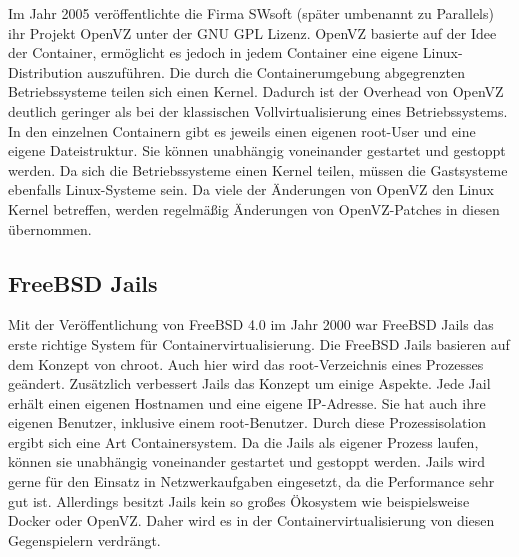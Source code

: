 Im Jahr 2005 veröffentlichte die Firma SWsoft (später umbenannt zu Parallels) ihr Projekt OpenVZ unter der GNU GPL Lizenz. OpenVZ basierte auf der Idee der Container, ermöglicht es jedoch in jedem Container eine eigene Linux-Distribution auszuführen.
Die durch die Containerumgebung abgegrenzten Betriebssysteme teilen sich einen Kernel. Dadurch ist der Overhead von OpenVZ deutlich geringer als bei der klassischen Vollvirtualisierung eines Betriebssystems.
In den einzelnen Containern gibt es jeweils einen eigenen root-User und eine eigene Dateistruktur.
Sie können unabhängig voneinander gestartet und gestoppt werden.
Da sich die Betriebssysteme einen Kernel teilen, müssen die Gastsysteme ebenfalls Linux-Systeme sein.
Da viele der Änderungen von OpenVZ den Linux Kernel betreffen, werden regelmäßig Änderungen von OpenVZ-Patches in diesen übernommen. \citep{OpenVzNews, IEEE4803091,OpenVzHist}


\subsection*{FreeBSD Jails}
\label{sec:jails}
Mit der Veröffentlichung von FreeBSD 4.0 im Jahr 2000 war FreeBSD Jails das erste richtige System für Containervirtualisierung.
Die FreeBSD Jails basieren auf dem Konzept von chroot. Auch hier wird das root-Verzeichnis eines Prozesses geändert. Zusätzlich verbessert Jails das Konzept um einige Aspekte. Jede Jail erhält einen eigenen Hostnamen und eine eigene IP-Adresse. Sie hat auch ihre eigenen Benutzer, inklusive einem root-Benutzer. \citep{FreeBSDHB14} Durch diese Prozessisolation ergibt sich eine Art Containersystem. Da die Jails als eigener Prozess laufen, können sie unabhängig voneinander gestartet und gestoppt werden. Jails wird gerne für den Einsatz in Netzwerkaufgaben eingesetzt, da die Performance sehr gut ist. Allerdings besitzt Jails kein so großes Ökosystem wie beispielsweise Docker oder OpenVZ. Daher wird es in der Containervirtualisierung von diesen Gegenspielern verdrängt.


